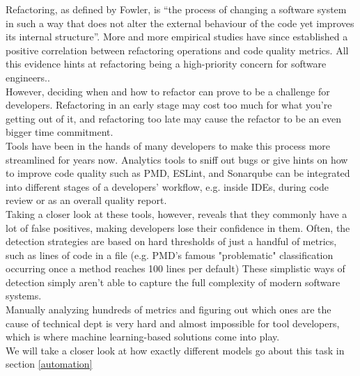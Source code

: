 Refactoring, as defined by Fowler\cite{fowler2018refactoring}, is “the process of changing a software system in such a way that does not alter the external behaviour of the code yet improves its internal structure”. More and more empirical studies have since established a positive correlation between refactoring operations and code quality metrics. All this evidence hints at refactoring being a high-priority concern for software engineers.\cite{aniche2020effectiveness}.\\
However, deciding when and how to refactor can prove to be a challenge for developers. Refactoring in an early stage may cost too much for what you're getting out of it, and refactoring too late may cause the refactor to be an even bigger time commitment.\cite{kruchten2012technical}\\
Tools have been in the hands of many developers to make this process more streamlined for years now. Analytics tools to sniff out bugs or give hints on how to improve code quality such as PMD, ESLint, and Sonarqube can be integrated into different stages of a developers' workflow, e.g. inside IDEs, during code review or as an overall quality report. \cite{aniche2020effectiveness}\\
Taking a closer look at these tools, however, reveals that they commonly have a lot of false positives, making developers lose their confidence in them. Often, the detection strategies are based on hard thresholds of just a handful of metrics, such as lines of code in a file (e.g. PMD's famous "problematic" classification occurring once a method reaches 100 lines per default)\cite{aniche2020effectiveness} These simplistic ways of detection simply aren't able to capture the full complexity of modern software systems.\\
Manually analyzing hundreds of metrics and figuring out which ones are the cause of technical dept is very hard and almost impossible for tool developers, which is where machine learning-based solutions come into play.\cite{kataoka2002refactoring}\cite{leitch2003maintainability}\\
We will take a closer look at how exactly different models go about this task in section \ref{automation}
